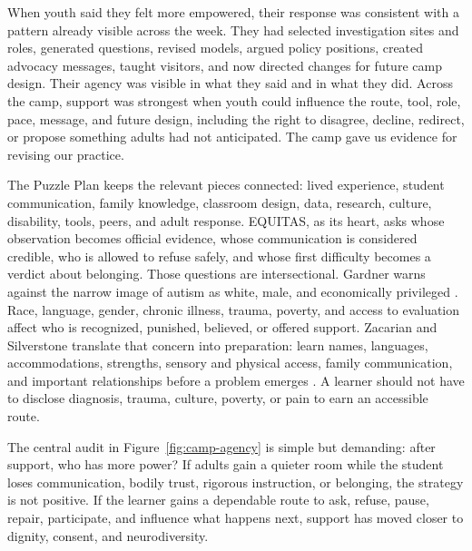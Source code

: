 When youth said they felt more empowered, their response was consistent with a pattern already visible across the week. They had selected investigation sites and roles, generated questions, revised models, argued policy positions, created advocacy messages, taught visitors, and now directed changes for future camp design. Their agency was visible in what they said and in what they did. Across the camp, support was strongest when youth could influence the route, tool, role, pace, message, and future design, including the right to disagree, decline, redirect, or propose something adults had not anticipated. The camp gave us evidence for revising our practice.


The Puzzle Plan keeps the relevant pieces connected: lived experience, student communication, family knowledge, classroom design, data, research, culture, disability, tools, peers, and adult response. EQUITAS, as its heart, asks whose observation becomes official evidence, whose communication is considered credible, who is allowed to refuse safely, and whose first difficulty becomes a verdict about belonging. Those questions are intersectional. Gardner warns against the narrow image of autism as white, male, and economically privileged \citep{gardner2017firsthand}. Race, language, gender, chronic illness, trauma, poverty, and access to evaluation affect who is recognized, punished, believed, or offered support. Zacarian and Silverstone translate that concern into preparation: learn names, languages, accommodations, strengths, sensory and physical access, family communication, and important relationships before a problem emerges \citep{zacarian2015community}. A learner should not have to disclose diagnosis, trauma, culture, poverty, or pain to earn an accessible route.

The central audit in Figure~\ref{fig:camp-agency} is simple but demanding: after support, who has more power? If adults gain a quieter room while the student loses communication, bodily trust, rigorous instruction, or belonging, the strategy is not positive. If the learner gains a dependable route to ask, refuse, pause, repair, participate, and influence what happens next, support has moved closer to dignity, consent, and neurodiversity.

